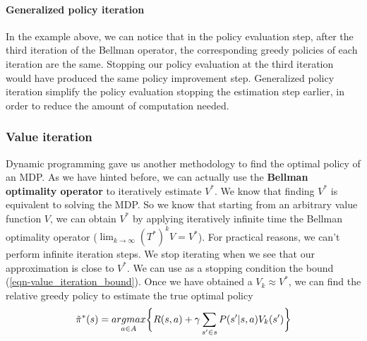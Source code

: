 \documentclass[../main.tex]{subfiles}
\begin{document}
\paragraph{Generalized policy iteration} In the example above, we can notice that in the policy evaluation step, after the third iteration of the Bellman operator, the corresponding greedy policies of each iteration are the same. Stopping our policy evaluation at the third iteration would have produced the same policy improvement step. Generalized policy iteration simplify the policy evaluation stopping the estimation step earlier, in order to reduce the amount of computation needed.

\subsubsection{Value iteration}
Dynamic programming gave us another methodology to find the optimal policy of an MDP. As we have hinted before, we can actually use the \textbf{Bellman optimality operator} to iteratively estimate $V^*$. We know that finding $V^*$ is equivalent to solving the MDP. So we know that starting from an arbitrary value function $V$, we can obtain $V^*$ by applying iteratively infinite time the Bellman optimality operator ($\lim_{k \rightarrow \infty} (T^*)^k V = V^*$).
For practical reasons, we can't perform infinite iteration steps. We stop iterating when we see that our approximation is close to $V^*$. We can use as a stopping condition the bound (\ref{eqn-value_iteration_bound}).
\newline
Once we have obtained a $V_k \approx V^*$, we can find the relative greedy policy to estimate the true optimal policy
\begin{equation}
    \Tilde{\pi}^*(s) = \underset{a \in A}{argmax} \bigg\{ R(s,a) + \gamma \sum_{s' \in s} P(s'|s,a) V_k(s') \bigg\}
\end{equation}

\newpage
\end{document}
